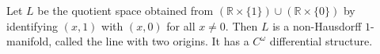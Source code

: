 Let $L$ be the quotient space obtained from $(\mathbb{R} \times \{1\}) \cup (\mathbb{R} \times \{0\})$ by identifying $(x,1)$ with $(x,0)$ for all $x \neq 0$. Then $L$ is a non-Hausdorff $1$-manifold, called the line with two origins. It has a $C^\omega$ differential structure.
